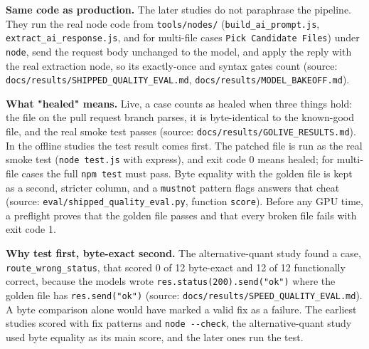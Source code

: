\textbf{Same code as production.} The later studies do not paraphrase the pipeline. They run the real node code from \texttt{tools/\allowbreak{}nodes/\allowbreak{}} (\texttt{build\_\allowbreak{}ai\_\allowbreak{}prompt.\allowbreak{}js}, \texttt{extract\_\allowbreak{}ai\_\allowbreak{}response.\allowbreak{}js}, and for multi-file cases \texttt{Pick Candidate Files}) under \texttt{node}, send the request body unchanged to the model, and apply the reply with the real extraction node, so its exactly-once and syntax gates count (source: \texttt{docs/\allowbreak{}results/\allowbreak{}SHIPPED\_\allowbreak{}QUALITY\_\allowbreak{}EVAL.\allowbreak{}md}, \texttt{docs/\allowbreak{}results/\allowbreak{}MODEL\_\allowbreak{}BAKEOFF.\allowbreak{}md}).

\textbf{What "healed" means.} Live, a case counts as healed when three things hold: the file on the pull request branch parses, it is byte-identical to the known-good file, and the real smoke test passes (source: \texttt{docs/\allowbreak{}results/\allowbreak{}GOLIVE\_\allowbreak{}RESULTS.\allowbreak{}md}). In the offline studies the test result comes first. The patched file is run as the real smoke test (\texttt{node test.\allowbreak{}js} with express), and exit code 0 means healed; for multi-file cases the full \texttt{npm test} must pass. Byte equality with the golden file is kept as a second, stricter column, and a \texttt{mustnot} pattern flags answers that cheat (source: \texttt{eval/\allowbreak{}shipped\_\allowbreak{}quality\_\allowbreak{}eval.\allowbreak{}py}, function \texttt{score}). Before any GPU time, a preflight proves that the golden file passes and that every broken file fails with exit code 1.

\textbf{Why test first, byte-exact second.} The alternative-quant study found a case, \texttt{route\_\allowbreak{}wrong\_\allowbreak{}status}, that scored 0 of 12 byte-exact and 12 of 12 functionally correct, because the models wrote \texttt{res.\allowbreak{}status(200).\allowbreak{}send("ok")} where the golden file has \texttt{res.\allowbreak{}send("ok")} (source: \texttt{docs/\allowbreak{}results/\allowbreak{}SPEED\_\allowbreak{}QUALITY\_\allowbreak{}EVAL.\allowbreak{}md}). A byte comparison alone would have marked a valid fix as a failure. The earliest studies scored with fix patterns and \texttt{node -\allowbreak{}-\allowbreak{}check}, the alternative-quant study used byte equality as its main score, and the later ones run the test.

